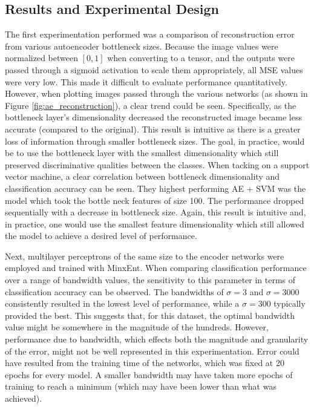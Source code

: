 \documentclass[conference]{IEEEtran}
\begin{document}
\subsection{Results and Experimental Design}

The first experimentation performed was a comparison of reconstruction error from various autoencoder bottleneck sizes.  Because the image values were normalized between $[0,1]$ when converting to a tensor, and the outputs were passed through a sigmoid activation to scale them appropriately, all MSE values were very low.  This  made it difficult to evaluate performance quantitatively.  However, when plotting images passed through the various networks (as shown in Figure \ref{fig:ae_reconstruction}), a clear trend could be seen.  Specifically, as the bottleneck layer's dimensionality decreased the reconstructed image became less accurate (compared to the original).  This result is intuitive as there is a greater loss of information through smaller bottleneck sizes.  The goal, in practice, would be to use the bottleneck layer with the smallest dimensionality which still preserved discriminative qualities between the classes. When tacking on a support vector machine, a clear correlation between bottleneck dimensionality and classification accuracy can be seen.  They highest performing AE + SVM was the model which took the bottle neck features of size 100.  The performance dropped sequentially with a decrease in bottleneck size.  Again, this result is intuitive and, in practice, one would use the smallest feature dimensionality which still allowed the model to achieve a desired level of performance.

Next, multilayer perceptrons  of the same size to the encoder networks were employed and trained with MinxEnt.  When comparing classification performance over a range of bandwidth values, the sensitivity to this parameter in terms of classification accuracy can be observed. The bandwidths of $\sigma=3$ and $\sigma=3000$ consistently resulted in the lowest  level of performance, while a $\sigma=300$ typically provided the best.  This suggests that, for this dataset, the optimal bandwidth value might be somewhere in the magnitude of the hundreds.  However, performance due to bandwidth, which effects both the magnitude and granularity of the error, might not be well represented in this experimentation.  Error could have resulted from the training time of the networks, which was fixed at 20 epochs for every model.  A smaller bandwidth may have taken more epochs of training to reach a minimum (which may have been lower than what was achieved).
\end{document}
